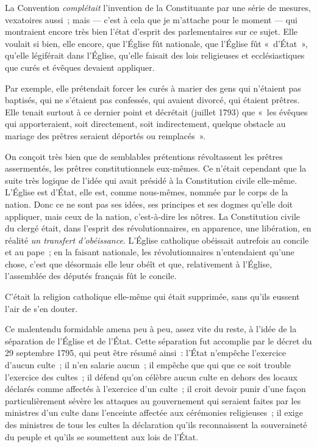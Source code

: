 \documentclass[french,twoside]{book} %
\begin{document}
La Convention {\itshape complétait} l’invention de la Constituante par une série de mesures, vexatoires aussi ; mais — c’est à cela que je m’attache pour le moment — qui montraient encore très bien l’état d’esprit des parlementaires sur ce sujet. Elle voulait si bien, elle encore, que l’Église fût nationale, que l’Église fût « d’État », qu’elle légiférait dans l’Église, qu’elle faisait des lois religieuses et ecclésiastiques que curés et évêques devaient appliquer.\par
Par exemple, elle prétendait forcer les curés à marier des gens qui n’étaient pas baptisés, qui ne s’étaient pas confessés, qui avaient divorcé, qui  étaient prêtres. Elle tenait surtout à ce dernier point et décrétait (juillet 1793) que « les évêques qui apporteraient, soit directement, soit indirectement, quelque obstacle au mariage des prêtres seraient déportés ou remplacés ».\par
On conçoit très bien que de semblables prétentions révoltassent les prêtres assermentés, les prêtres constitutionnels eux-mêmes. Ce n’était cependant que la suite très logique de l’idée qui avait présidé à la Constitution civile elle-même. L’Église est d’État, elle est, comme nous-mêmes, nommée par le corps de la nation. Donc ce ne sont pas ses idées, ses principes et ses dogmes qu’elle doit appliquer, mais ceux de la nation, c’est-à-dire les nôtres. La Constitution civile du clergé était, dans l’esprit des révolutionnaires, en apparence, une libération, en réalité {\itshape un transfert d’obéissance}. L’Église catholique obéissait autrefois au concile et au pape ; en la faisant nationale, les révolutionnaires n’entendaient qu’une chose, c’est que désormais elle leur obéît et que, relativement à l’Église, l’assemblée des députés français fût le concile.\par
C’était la religion catholique elle-même qui était supprimée, sans qu’ils eussent l’air de s’en douter.\par
Ce malentendu formidable amena peu à peu, assez vite du reste, à l’idée de la séparation de  l’Église et de l’État. Cette séparation fut accomplie par le décret du 29 septembre 1795, qui peut être résumé ainsi : l’État n’empêche l’exercice d’aucun culte ; il n’en salarie aucun ; il empêche que qui que ce soit trouble l’exercice des cultes ; il défend qu’on célèbre aucun culte en dehors des locaux déclarés comme affectés à l’exercice d’un culte ; il croit devoir punir d’une façon particulièrement sévère les attaques au gouvernement qui seraient faites par les ministres d’un culte dans l’enceinte affectée aux cérémonies religieuses ; il exige des ministres de tous les cultes la déclaration qu’ils reconnaissent la souveraineté du peuple et qu’ils se soumettent aux lois de l’État.\par
\end{document}
